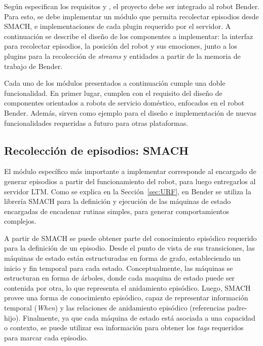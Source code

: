 Según especifican los requisitos  y , el proyecto debe ser integrado al robot Bender. Para esto, se debe implementar un módulo que permita recolectar episodios desde SMACH, e implementaciones de cada plugin requerido por el servidor. A continuación se describe el diseño de los componentes a implementar: la interfaz para recolectar episodios, la posición del robot y sus emociones, junto a los plugins para la recolección de \textit{streams} y entidades a partir de la memoria de trabajo de Bender. 

Cada uno de los módulos presentados a continuación cumple una doble funcionalidad. En primer lugar, cumplen con el requisito del diseño de componentes orientados a robots de servicio doméstico, enfocados en el robot Bender. Además, sirven como ejemplo para el diseño e implementación de nuevas funcionalidades requeridas a futuro para otras plataformas.

\subsection{Recolección de episodios: SMACH}

El módulo específico más importante a implementar corresponde al encargado de generar episodios a partir del funcionamiento del robot, para luego entregarlos al servidor LTM. Como se explica en la Sección~\ref{sec:URF}, en Bender se utiliza la librería SMACH para la definición y ejecución de las máquinas de estado encargadas de encadenar rutinas simples, para generar comportamientos complejos.

A partir de SMACH se puede obtener parte del conocimiento episódico requerido para la definición de un episodio. Desde el punto de vista de sus transiciones, las máquinas de estado están estructuradas en forma de grafo, estableciendo un inicio y fin temporal para cada estado. Conceptualmente, las máquinas se estructuran en forma de árboles, donde cada maquina de estado puede ser contenida por otra, lo que representa el anidamiento episódico. Luego, SMACH provee una forma de conocimiento episódico, capaz de representar información temporal (\textit{When}) y las relaciones de anidamiento episódico (referencias padre-hijo). Finalmente, ya que cada máquina de estado está asociada a una capacidad o contexto, se puede utilizar esa información para obtener los \textit{tags} requeridos para marcar cada episodio.


